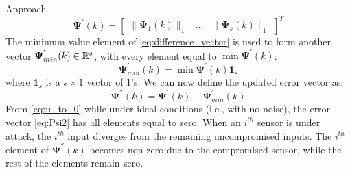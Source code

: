 \begin{section}{Approach}
    \begin{equation}
    \label{eq:difference_vector}
	\bm{\Psi^{'}}(k)=\begin{bmatrix} \lVert{\bm{\Psi}_1(k)}\rVert_1 & \dots & \lVert{\bm{\Psi}_s(k)}\rVert_1 \end{bmatrix}^T
	\end{equation}
The minimum value element of \eqref{eq:difference_vector} is used to form another vector $\bm{\Psi}^{'}_{min}(k) \in \mathbb{R}^s$, with every element equal to $\min \bm{\Psi}^{'}(k)$:
    \begin{equation}
	\bm{\Psi}^{'}_{min}(k)=\min \bm{\Psi}^{'}(k){\bm{1}}_s
	\end{equation}
where ${\bm{1}}_s$ is a $s\times1$ vector of 1's. We can now define the updated error vector as:
    \begin{equation}
    \label{eq:Psi2}
	\bm{\Psi}^{''}(k)=\bm{\Psi}^{'}(k)-\bm{\Psi}^{'}_{min}(k)
	\end{equation}
From \eqref{eq:u_to_0} while under ideal conditions (i.e., with no noise), the error vector \eqref{eq:Psi2} has all elements equal to zero. When an $i^{th}$ sensor is under attack, the $i^{th}$ input diverges from the remaining uncompromised inputs. The $i^{th}$ element of $\bm{\Psi}^{''}(k)$ becomes non-zero due to the compromised sensor, while the rest of the elements remain zero. 


\end{section}

